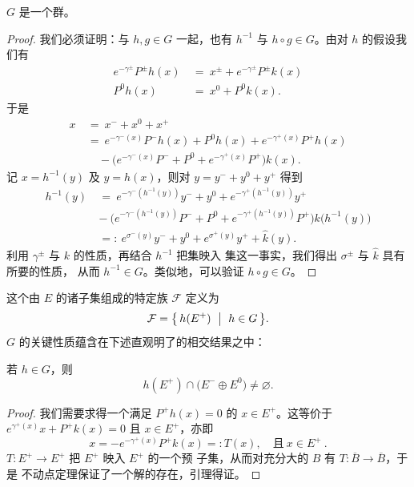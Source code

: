 \begin{lemma}\label{lem:g-is-group}
$G$ 是一个群。
\end{lemma}

\begin{proof}
我们必须证明：与 $h,g\in G$ 一起，也有 $h^{-1}$ 与 $h\circ g\in G$。由对 $h$%
的假设我们有
\begin{align*}
e^{-\gamma^{\pm}}P^{\pm}h(x)\ &=\ x^{\pm}+e^{-\gamma^{\pm}}P^{\pm}k(x)\\
P^{0}h(x)\ &=\ x^{0}+P^{0}k(x).
\end{align*}
于是
\begin{align*}
x\ &=\ x^{-}+x^{0}+x^{+}\\
&=\ e^{-\gamma^{-}(x)}P^{-}h(x)+P^{0}h(x)+e^{-\gamma^{+}(x)}P^{+}h(x)\\
&\quad-\bigl(e^{-\gamma^{-}(x)}P^{-}+P^{0}+e^{-\gamma^{+}(x)}P^{+}\bigr)k(x).
\end{align*}
记 $x=h^{-1}(y)$ 及 $y=h(x)$，则对 $y=y^{-}+y^{0}+y^{+}$ 得到
\begin{align*}
h^{-1}(y)\ &=\ e^{-\gamma^{-}(h^{-1}(y))}y^{-}+y^{0}+e^{-\gamma^{+}(h^{-1}(y))}y^{+}\\
&-\ \bigl(e^{-\gamma^{-}(h^{-1}(y))}P^{-}+P^{0}+e^{-\gamma^{+}(h^{-1}(y))}P^{+}\bigr)k\bigl(h^{-1}(y)\bigr)\\
&=:\ e^{\sigma^{-}(y)}y^{-}+y^{0}+e^{\sigma^{+}(y)}y^{+}+\hat{k}(y).
\end{align*}
利用 $\gamma^{\pm}$ 与 $k$ 的性质，再结合 $h^{-1}$ 把\trBounded{}集映入%
\trBounded{}集这一事实，我们得出 $\sigma^{\pm}$ 与 $\hat{k}$ 具有所要的性质，%
从而 $h^{-1}\in G$。类似地，可以验证 $h\circ g\in G$。
\end{proof}

这个由 $E$ 的诸子集组成的特定族 $\mathcal{F}$ 定义为
\[
\mathcal{F}=\bigl\{\,h(E^{+})\ \bigm|\ h\in G\,\bigr\}.
\]
$G$ 的关键\trTopology{}性质蕴含在下述直观明了的相交结果之中：

\begin{lemma}\label{lem:intersection-nonempty}
若 $h\in G$，则
\[
h(E^{+})\cap\bigl(E^{-}\oplus E^{0}\bigr)\neq\varnothing.
\]
\end{lemma}

\begin{proof}
我们需要求得一个满足 $P^{+}h(x)=0$ 的 $x\in E^{+}$。这等价于%
$e^{\gamma^{+}(x)}x+P^{+}k(x)=0$ 且 $x\in E^{+}$，亦即
\[
x=-e^{-\gamma^{+}(x)}P^{+}k(x)=:T(x),\quad\text{且}\ x\in E^{+}\ .
\]
\trOperator{} $T:E^{+}\to E^{+}$ 把 $E^{+}$ 映入 $E^{+}$ 的一个预\trCompact{}%
子集，从而对充分大的\trBall{} $B$ 有 $T:\overline{B}\to\overline{B}$，于是%
\trSchauder{}不动点定理保证了一个解的存在，引理得证。
\end{proof}

